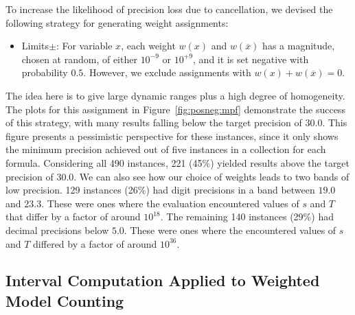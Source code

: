 \documentclass{easychair}
\newcommand{\obar}[1]{\overline{#1}}
\begin{document}
To increase the likelihood of precision loss due to cancellation, we devised the following strategy for generating weight assignments:
\begin{itemize}
\item\textsf{Limits$\pm$}:  For variable $x$, each weight $w(x)$ and $w(\obar{x})$ has a magnitude, chosen at random, of either $10^{-9}$ or $10^{+9}$, and it is set negative with probability $0.5$.
  However, we exclude assignments with $w(x) + w(\obar{x}) = 0$.
\end{itemize}
The idea here is to give large dynamic ranges plus a high degree of
homogeneity.  The plots for this assignment in
Figure~\ref{fig:posneg:mpf} demonstrate the success of this strategy,
with many results falling below the target precision of $30.0$.
This figure
 presents a pessimistic
perspective for these instances, since it only shows the minimum
precision achieved out of five instances in a collection for each formula.  Considering all 490
instances,
221 (45\%) yielded results above the
target precision of $30.0$.  We can also see how our choice of weights
leads to two bands of low precision.  129 instances (26\%) had digit
precisions in a band between $19.0$ and $23.3$.  These were ones where
the evaluation encountered values of $s$ and $T$ that
differ by a factor of around $10^{18}$.  The remaining 140 instances
(29\%) had decimal precisions below $5.0$.  These were ones where the
encountered values of $s$ and $T$ differed by a factor of around
 $10^{36}$.

\subsection{Interval Computation Applied to Weighted Model Counting}
\label{sect:interval}
\end{document}
